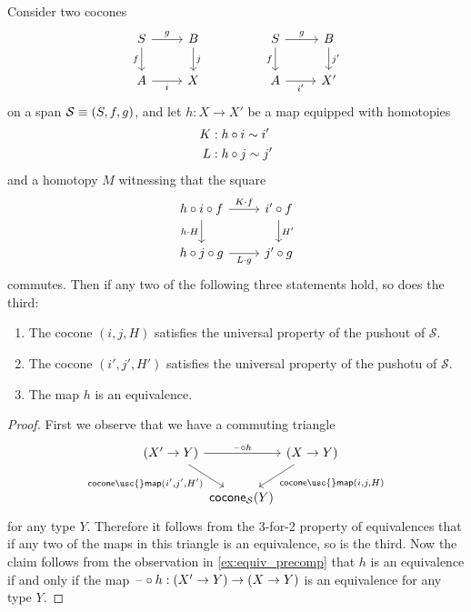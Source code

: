 \begin{thm}\label{thm:3-for-2-pushout}
  Consider two cocones
  \begin{equation*}
    \begin{tikzcd}
      S \arrow[r,"g"] \arrow[d,swap,"f"] & B \arrow[d,"j"]
      & & S \arrow[r,"g"] \arrow[d,swap,"f"] & B \arrow[d,"{j'}"] \\
      A \arrow[r,swap,"i"] & X
      & & A \arrow[r,swap,"{i'}"] & X'
    \end{tikzcd}
  \end{equation*}
  on a span $\mathcal{S}\equiv(S,f,g)$, and let $h:X\to X'$ be a map equipped with homotopies
  \begin{align*}
    K & : h\circ i \sim i' \\
    L & : h\circ j \sim j'
  \end{align*}
  and a homotopy $M$ witnessing that the square
  \begin{equation*}
    \begin{tikzcd}
      h\circ i\circ f \arrow[r,"K\cdot f"] \arrow[d,swap,"h\cdot H"] & i' \circ f \arrow[d,"{H'}"] \\
      h\circ j\circ g \arrow[r,swap,"L\cdot g"] & j'\circ g
    \end{tikzcd}
  \end{equation*}
  commutes. Then if any two of the following three statements hold, so does the third:
  \begin{enumerate}
  \item The cocone $(i,j,H)$ satisfies the universal property of the pushout of $\mathcal{S}$.
  \item The cocone $(i',j',H')$ satisfies the universal property of the pushotu of $\mathcal{S}$.
  \item The map $h$ is an equivalence.
  \end{enumerate}
\end{thm}

\begin{proof}
  First we observe that we have a commuting triangle
  \begin{equation*}
    \begin{tikzcd}[column sep=0]
      (X'\to Y) \arrow[rr,"\blank\circ h"]
      \arrow[dr,swap,"{\mathsf{cocone\usc{}map}(i',j',H')}"]
      & & (X\to Y) \arrow[dl,"{\mathsf{cocone\usc{}map}(i,j,H)}"] \\
      & \mathsf{cocone}_{\mathcal{S}}(Y) & \phantom{(X'\to Y)}
    \end{tikzcd}
  \end{equation*}
  for any type $Y$. Therefore it follows from the 3-for-2 property of equivalences that if any two of the maps in this triangle is an equivalence, so is the third. Now the claim follows from the observation in \cref{ex:equiv_precomp} that $h$ is an equivalence if and only if the map $\mathord{\hspace{1pt}\text{--}\hspace{1pt}}\circ h:(X'\to Y)\to (X\to Y)$ is an equivalence for any type $Y$.
\end{proof}

